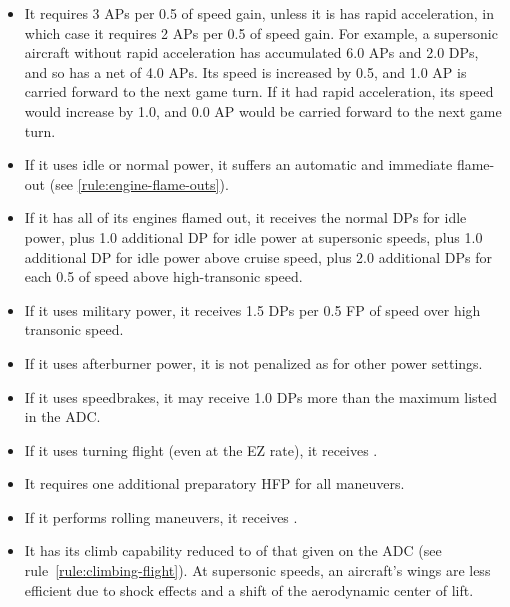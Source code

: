 \begin{advancedrules}
{\begin{itemize}
   \item It requires 3 APs per 0.5 of speed gain, unless it is has rapid acceleration, in which case it requires 2 APs per 0.5 of speed gain. For example, a supersonic aircraft without rapid acceleration has accumulated 6.0 APs and 2.0 DPs, and so has a net of 4.0 APs. Its speed is increased by 0.5, and 1.0 AP is carried forward to the next game turn. If it had rapid acceleration, its speed would increase by 1.0, and 0.0 AP would be carried forward to the next game turn.

    \item If it uses idle or normal power, it suffers an automatic and immediate flame-out (see \ref{rule:engine-flame-outs}).

    \item If it has all of its engines flamed out, it receives the normal DPs for idle power, plus 1.0 additional DP for idle power at supersonic speeds, plus 1.0 additional DP for idle power above cruise speed, plus 2.0 additional DPs for each 0.5 of speed above high-transonic speed.
   
    \item If it uses military power, it receives 1.5 DPs per 0.5 FP of speed over high transonic speed.

    \item If it uses afterburner power, it is not penalized as for other power settings.

    \item If it uses speedbrakes, it may receive 1.0 DPs more than the maximum listed in the ADC.

    \item If it uses turning flight (even at the EZ rate), it receives .

    \item It requires one additional preparatory HFP for all maneuvers. 

    \item If it performs rolling maneuvers, it receives .

    \item It has its climb capability reduced to {\twothirds} of that given on the ADC (see rule~\ref{rule:climbing-flight}). At supersonic speeds, an aircraft's wings are less efficient due to shock effects and a shift of the aerodynamic center of lift.


\end{itemize}}
\end{advancedrules}
